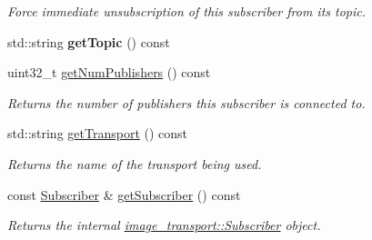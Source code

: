 \begin{DoxyCompactItemize}
\begin{DoxyCompactList}\small\item\em Force immediate unsubscription of this subscriber from its topic. \end{DoxyCompactList}\item 
\hypertarget{classimage__transport_1_1_subscriber_filter_a9579b79c3a19cfcbd84586efddad52d5}{std\-::string {\bfseries get\-Topic} () const }\label{classimage__transport_1_1_subscriber_filter_a9579b79c3a19cfcbd84586efddad52d5}

\item 
\hypertarget{classimage__transport_1_1_subscriber_filter_abebc23b9066f8c684a1ce6d3906d5f99}{uint32\-\_\-t \hyperlink{classimage__transport_1_1_subscriber_filter_abebc23b9066f8c684a1ce6d3906d5f99}{get\-Num\-Publishers} () const }\label{classimage__transport_1_1_subscriber_filter_abebc23b9066f8c684a1ce6d3906d5f99}

\begin{DoxyCompactList}\small\item\em Returns the number of publishers this subscriber is connected to. \end{DoxyCompactList}\item 
\hypertarget{classimage__transport_1_1_subscriber_filter_a9ba5a0e16e68dc055e0e4aba9679a281}{std\-::string \hyperlink{classimage__transport_1_1_subscriber_filter_a9ba5a0e16e68dc055e0e4aba9679a281}{get\-Transport} () const }\label{classimage__transport_1_1_subscriber_filter_a9ba5a0e16e68dc055e0e4aba9679a281}

\begin{DoxyCompactList}\small\item\em Returns the name of the transport being used. \end{DoxyCompactList}\item 
\hypertarget{classimage__transport_1_1_subscriber_filter_ab0fdf78b86de2231788b74a911892d4c}{const \hyperlink{classimage__transport_1_1_subscriber}{Subscriber} \& \hyperlink{classimage__transport_1_1_subscriber_filter_ab0fdf78b86de2231788b74a911892d4c}{get\-Subscriber} () const }\label{classimage__transport_1_1_subscriber_filter_ab0fdf78b86de2231788b74a911892d4c}

\begin{DoxyCompactList}\small\item\em Returns the internal \hyperlink{classimage__transport_1_1_subscriber}{image\-\_\-transport\-::\-Subscriber} object. \end{DoxyCompactList}\end{DoxyCompactItemize}


